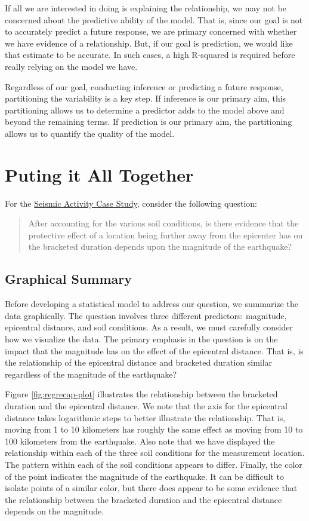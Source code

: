 \documentclass[]{book}
\theoremstyle{definition}
\theoremstyle{definition}
\theoremstyle{definition}
\theoremstyle{remark}
\begin{document}
If all we are interested in doing is explaining the relationship, we may
not be concerned about the predictive ability of the model. That is,
since our goal is not to accurately predict a future response, we are
primary concerned with whether we have evidence of a relationship. But,
if our goal is prediction, we would like that estimate to be accurate.
In such cases, a high R-squared is required before really relying on the
model we have.

Regardless of our goal, conducting inference or predicting a future
response, partitioning the variability is a key step. If inference is
our primary aim, this partitioning allows us to determine a predictor
adds to the model above and beyond the remaining terms. If prediction is
our primary aim, the partitioning allows us to quantify the quality of
the model.

\chapter{Puting it All Together}\label{Regrecap}

For the \protect\hyperlink{CaseGreece}{Seismic Activity Case Study},
consider the following question:

\begin{quote}
After accounting for the various soil conditions, is there evidence that
the protective effect of a location being further away from the
epicenter has on the bracketed duration depends upon the magnitude of
the earthquake?
\end{quote}

\section{Graphical Summary}\label{graphical-summary}

Before developing a statistical model to address our question, we
summarize the data graphically. The question involves three different
predictors: magnitude, epicentral distance, and soil conditions. As a
result, we must carefully consider how we visualize the data. The
primary emphasis in the question is on the impact that the magnitude has
on the effect of the epicentral distance. That is, is the relationship
of the epicentral distance and bracketed duration similar regardless of
the magnitude of the earthquake?

Figure \ref{fig:regrecap-plot} illustrates the relationship between the
bracketed duration and the epicentral distance. We note that the axis
for the epicentral distance takes logarithmic steps to better illustrate
the relationship. That is, moving from 1 to 10 kilometers has roughly
the same effect as moving from 10 to 100 kilometers from the earthquake.
Also note that we have displayed the relationship within each of the
three soil conditions for the measurement location. The pattern within
each of the soil conditions appears to differ. Finally, the color of the
point indicates the magnitude of the earthquake. It can be difficult to
isolate points of a similar color, but there does appear to be some
evidence that the relationship between the bracketed duration and the
epicentral distance depends on the magnitude.
\end{document}

